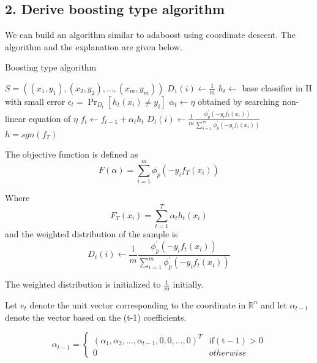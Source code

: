 \documentclass{article}
\begin{document}
\subsection*{2. Derive boosting type algorithm}
We can build an algorithm similar to adaboost using coordinate descent.  The algorithm and the explanation are given below.
\begin{algorithm}
  \caption{Boosting type algorithm}
  \begin{algorithmic}[1]
    \State{} \( S = ( (x_{1}, y_{1}), (x_{2}, y_{2}), \ldots, (x_{m}, y_{m})) \)
    \State{} $ D_{1}(i) \gets{}  \frac{1}{m}$
    \EndFor{}
    \State{} $h_{t} \gets{} $ base classifier in H with small error $ \epsilon_{t} = \Pr_{D_{t}}[h_{t}(x_{i}) \neq y_{i}] $
    \State{} $\alpha_{t} \gets{} \eta$ obtained by searching non-linear equation of $ \eta $
    \State{} $f_{t} \gets f_{t-1} + \alpha_{t}h_{t} $
    \EndFor{}
    \State{} $ D_{t}(i) \gets{}  \frac{1}{m} \frac{\phi^{'}_{p}(-y_{i}f_{t}(x_{i})) }{\sum_{i=1}^{m} \phi^{'}_{p}(-y_{i}f_{t}(x_{i}))}$
    \EndFor{}
    \Return{} \( h = sgn(f_{T}) \)
  \end{algorithmic}
\end{algorithm}

The objective function is defined as 
\begin{equation*}
  F(\alpha) = \sum_{i = 1}^{m} \phi_{p} (-y_{i}f_{T}(x_{i}))
\end{equation*}

Where
\begin{equation*}
  F_{T}(x_{i}) = \sum_{t=1}^{T} \alpha_{t}h_{t}(x_{i})
\end{equation*}
and the weighted distribution of the sample is 
\begin{equation*}
  D_{t}(i) \gets{}  \frac{1}{m} \frac{\phi^{'}_{p}(-y_{i}f_{t}(x_{i})) }{\sum_{i=1}^{m} \phi^{'}_{p}(-y_{i}f_{t}(x_{i}))}
\end{equation*}

The weighted distribution is initialized to \( \frac{1}{m} \) initially.


Let $ e_{t} $ denote the unit vector corresponding to the coordinate in $ \mathbb{R}^{n} $ and let $\alpha_{t - 1}$ denote the vector based on the (t-1) coefficients.

\begin{equation*}
  \alpha_{t-1} = 
  \begin{cases}
    {(\alpha_{1}, \alpha_{2}, \ldots, \alpha_{t-1}, 0, 0, \ldots, 0)}^{T} & \mathrm{if (t-1) > 0}\\
    0 & otherwise
  \end{cases}
\end{equation*}
\end{document}
